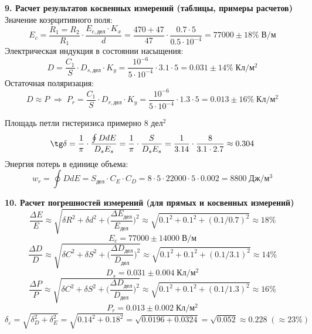 \documentclass[12pt,fleqn]{article}
\begin{document}
\newpage


\begin{justify}
    \textbf{9. Расчет результатов косвенных измерений (таблицы, примеры расчетов)} \\
    Значение коэрцитивного поля:
    \[ E_c = \frac{R_1 = R_2}{R_1} \cdot \frac{E_{c,\text{дел}} \cdot K_x}{d} = \frac{470 + 47}{47} \cdot \frac{0.7 \cdot 5}{0.5 \cdot 10^{-4}} = 77000 \pm 18\% \; \text{В}/\text{м} \]
    Электрическая индукция в состоянии насыщения:
    \[ D = \frac{C_1}{S} \cdot D_{s,\text{дел}} \cdot K_y = \frac{10^{-6}}{5 \cdot 10^{-4}} \cdot 3.1 \cdot 5 = 0.031 \pm 14\% \; \text{Кл}/\text{м}^2 \]
    Остаточная поляризация:
    \[ D \approx P \; \Rightarrow \; P_r = \frac{C_1}{S} \cdot D_{r,\text{дел}} \cdot K_y = \frac{10^{-6}}{5 \cdot 10^{-4}} \cdot 1.3 \cdot 5 = 0.013 \pm 16\% \; \text{Кл}/\text{м}^2 \]

    Площадь петли гистеризиса примерно 8 $\text{дел}^2$
    \[ \tg \delta = \frac{1}{\pi} \cdot \frac{\oint DdE}{D_sE_s} = \frac{1}{\pi} \cdot \frac{S}{D_sE_s} = \frac{1}{3.14} \cdot \frac{8}{3.1 \cdot 2.7} \approx 0.304 \]
    Энергия потерь в единице объема:
    \[ w_r = \oint DdE = S_{\text{дел}} \cdot C_E \cdot C_D = 8 \cdot 5 \cdot 22000 \cdot 5 \cdot 0.002 = 8800 \; \text{Дж}/\text{м}^3 \]
\end{justify}

\begin{justify}
    \textbf{10. Расчет погрешностей измерений (для прямых и косвенных измерений)} \\
    \[ \frac{\Delta E}{E} \approx \sqrt{\delta R^2 + \delta d^2 + \Big( \frac{\Delta E_{\text{дел}}}{E_{\text{дел}}}\Big)^2} \approx \sqrt{0.1^2 + 0.1^2 + (0.1/0.7)^2} \approx 18 \% \]
    \[ E_c = 77000 \pm 14000 \; \text{В}/\text{м} \]
    \[ \frac{\Delta D}{D} \approx \sqrt{\delta C^2 + \delta S^2 + \Big( \frac{\Delta D_{\text{дел}}}{D_{\text{дел}}}\Big)^2} \approx \sqrt{0.1^2 + 0.1^2 + (0.1/3.1)^2} \approx 14 \% \]
    \[ D_s = 0.031 \pm 0.004 \; \text{Кл}/\text{м}^2 \]
    \[ \frac{\Delta P}{P} \approx \sqrt{\delta C^2 + \delta S^2 + \Big( \frac{\Delta D_{\text{дел}}}{D_{\text{дел}}}\Big)^2} \approx \sqrt{0.1^2 + 0.1^2 + (0.1/1.3)^2} \approx 16 \% \]
    \[ P_r = 0.013 \pm 0.002 \; \text{Кл}/\text{м}^2 \]
    \[ \delta_{\varepsilon} = \sqrt{\delta_D^2 + \delta_E^2} = \sqrt{0.14^2 + 0.18^2} = \sqrt{0.0196 + 0.0324} = \sqrt{0.052} \approx 0.228 \; (\approx 23\%) \]
\end{justify}


\newpage
\end{document}
